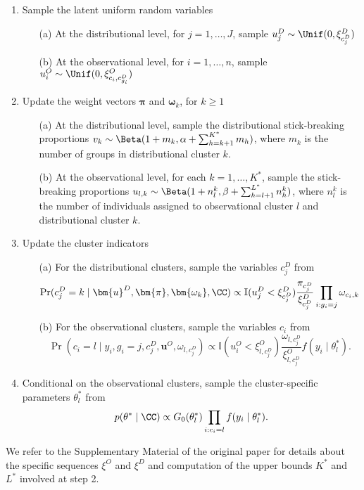 \begin{enumerate}
	\item Sample the latent uniform random variables
	\begin{enumerate}
		\item[(a)] At the distributional level, for $j=1,\dots,J$, sample $u^D_j\sim \Unif(0, \xi^D_{c^D_j})$
		\item[(b)] At the observational level, for $i=1,\dots,n$, sample $u^O_i \sim \Unif (0, \xi^O_{c_i,c^D_{g_i}})$
	\end{enumerate}
	\item Update the weight vectors $\bm{\pi}$ and $\bm{\omega}_k$, for $k\geq1$
		\begin{enumerate}
		\item[(a)] At the distributional level, sample the distributional stick-breaking proportions $v_k \sim \Beta (1 + m_k, \alpha + \sum_{h=k+1}^{K^*} m_h)$, where $m_k$ is the number of groups in distributional cluster $k$.
		\item[(b)] At the observational level, for each $k=1,\dots,K^*$, sample the stick-breaking proportions $u_{l,k} \sim \Beta (1 + n_l^k, \beta + \sum_{h=l+1}^{L^*} n_h^k)$, where $n_l^k$ is the number of individuals assigned to observational cluster $l$ and distributional cluster $k$.
	\end{enumerate}
	\item Update the cluster indicators
		\begin{enumerate}
		\item[(a)] For the distributional clusters, sample the variables $c^D_j$ from 
		$$ \Pr(c^D_j = k \mid \bm{u}^D, \bm{\pi}, \bm{\omega_k}, \CC) \propto \mathbb{I}(u^D_j < \xi^D_{c^D_j}) \frac{\pi_{c^D_j}}{\xi^D_{c^D_{j}}}  \prod_{i:g_i=j} \omega_{c_i,k} $$
		\item[(b)] For the observational clusters, sample the variables $c_i$ from 
		$$ \Pr (c_i = l \mid y_i, g_i = j, c^D_{j}, \bm{u}^O, \omega_{l,c^D_j}) \propto 
		\mathbb{I}(u_i^O < \xi_{l,c^D_j}^O) \frac{\omega_{l,c^D_j}}{\xi_{l,c^D_j}^O} f(y_i\mid\theta^*_{l}).$$
		\end{enumerate}
	\item Conditional on the observational clusters, sample the cluster-specific parameters $\theta^*_l$ from
	$$p(\theta^*\mid \CC) \propto G_0(\theta^*_l)\prod_{i:c_i=l} f(y_i\mid\theta^*_l).$$
\end{enumerate}
We refer to the Supplementary Material of the original paper for details about the specific sequences $\xi^O$ and $\xi^D$ and computation of the upper bounds $K^*$ and $L^*$ involved at step 2.














